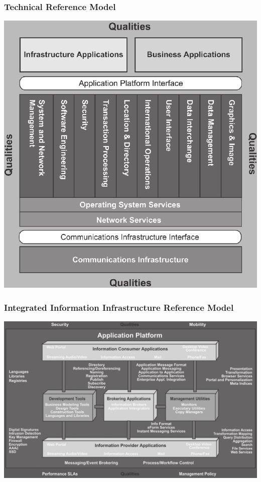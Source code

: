 \documentclass[aspectratio=169]{beamer}
\begin{document}
	{
		\begin{frame}
			\frametitle{Technical Reference Model}
			\begin{center}
				\includegraphics[width=.53\textwidth]{../figures/detailed_technical_reference_model}
			\end{center}
		\end{frame}
	}
	
	{
		\begin{frame}
			\frametitle{Integrated Information Infrastructure Reference Model}
			\begin{center}
				\includegraphics[width=.90\textwidth]{../figures/integrated_information_infrastructure_reference_model}
			\end{center}
		\end{frame}
	}
	
\end{document}
